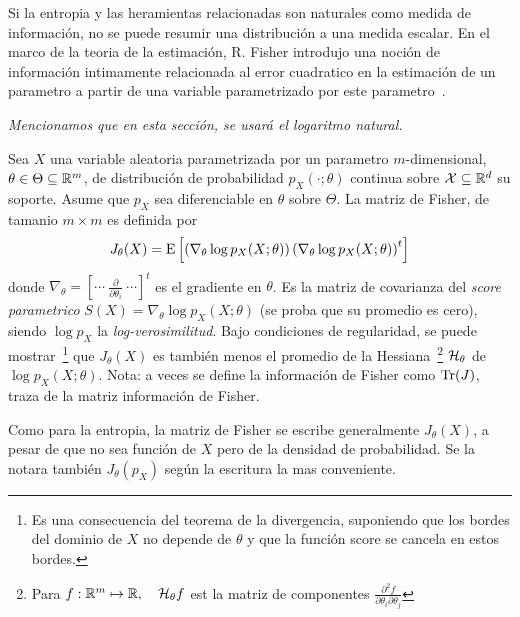 




Si  la entropia  y las  heramientas relacionadas  son naturales  como  medida de
informaci\'on, no se  puede resumir una distribuci\'on a  una medida escalar. En
el marco  de la teoria de la  estimaci\'on, R. Fisher introdujo  una noci\'on de
informaci\'on intimamente relacionada al  error cuadratico en la estimaci\'on de
un   parametro    a   partir   de   una   variable    parametrizado   por   este
parametro~\cite{Fis22,  Fis25:07,   Kay93,  Bos07,  CovTho06}.

{\it Mencionamos que en esta secci\'on, se usar\'a el logaritmo natural.}
%
\begin{definicion}
  Sea $X$ una variable aleatoria parametrizada por un parametro $m$-dimensional,
  $\theta  \in  \Theta \subseteq  \mathbb{R}^m$,  de  distribuci\'on de  probabilidad
  $p_X(\cdot;\theta)$ continua  sobre $\mathcal{X}  \subseteq \mathbb{R}^d$ su  soporte. Asume
  que $p_X$ sea diferenciable en  $\theta$ sobre $\Theta$.  La matriz de Fisher,
  de  tamanio $m \times  m$ es  definida por
  \[
  J_\theta(X)  =  \operatorname{E}\left[  \left(  \nabla_\theta \log  p_X(X;\theta)  \right)
    \left( \nabla_\theta \log p_X(X;\theta) \right)^t \right]
  \]
  donde $\nabla_\theta = \left[  \cdots \: \frac{\partial}{\partial \theta_i} \:
    \cdots \right]^t$ es  el gradiente en $\theta$.  Es  la matriz de covarianza
  del  {\it score  parametrico} $S(X)  = \nabla_\theta  \log  p_X(X;\theta)$ (se
  proba que su promedio es  cero), siendo $\log p_X$ la {\it log-verosimilitud}.
  Bajo   condiciones   de  regularidad,   se   puede  mostrar~\footnote{Es   una
    consecuencia del  teorema de la  divergencia, suponiendo que los  bordes del
    dominio de $X$ no depende de $\theta$ y que la funci\'on score se cancela en
    estos  bordes.}  que  $J_\theta(X)$ es  tambi\'en  menos el  promedio de  la
  Hessiana~\footnote{Para $f:  \mathbb{R}^m \mapsto \mathbb{R}, \quad  \mathcal{H}_\theta f$ est
    la  matriz de  componentes $\frac{\partial^2  f}{\partial  \theta_i \partial
      \theta_j}$}  $\mathcal{H}_\theta$ de  $\log  p_X(X;\theta)$.  Nota:  a veces  se
  define  la  informaci\'on  de  Fisher   como  $\operatorname{Tr}(J)$,  traza  de  la  matriz
  informaci\'on de Fisher.
\end{definicion}
%
Como  para   la  entropia,   la  matriz  de   Fisher  se   escribe  generalmente
$J_\theta(X)$, a  pesar de que no  sea funci\'on de  $X$ pero de la  densidad de
probabilidad. Se  la notara tambi\'en  $J_\theta(p_X)$ seg\'un la  escritura la
mas conveniente.

